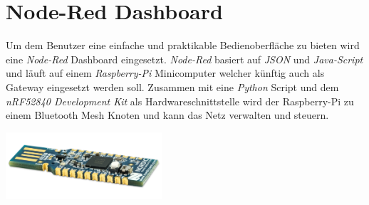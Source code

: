 {    \section{Node-Red Dashboard}
    Um dem Benutzer eine einfache und praktikable Bedienoberfläche zu bieten wird eine \textit{Node-Red} Dashboard eingesetzt. \textit{Node-Red} basiert auf \textit{JSON} und \textit{Java-Script} und läuft auf einem \textit{Raspberry-Pi} Minicomputer welcher künftig auch als Gateway eingesetzt werden soll. Zusammen mit eine \textit{Python} Script und dem \textit{nRF52840 Development Kit} als Hardwareschnittstelle wird der Raspberry-Pi zu einem Bluetooth Mesh Knoten und kann das Netz verwalten und steuern.\\



   \begin{minipage}{0.6\textwidth}
   	\includegraphics[height=25mm]{images/nRF52840_Dongle.png}
   \end{minipage}
}

